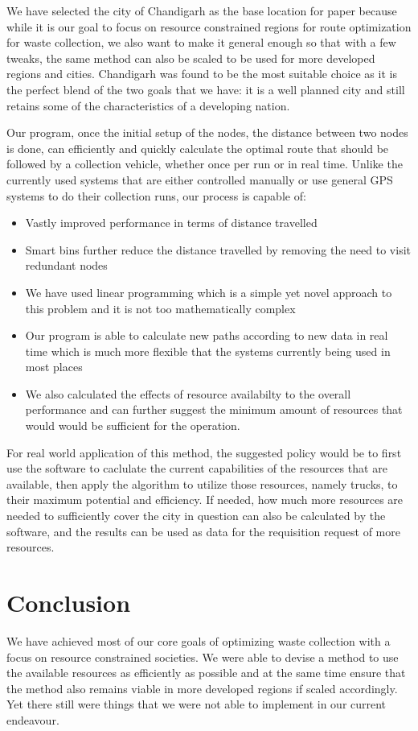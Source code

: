 \documentclass[12pt]{article}
\begin{document}
We have selected the city of Chandigarh as the base location for paper because while it is our goal to focus on resource constrained regions for route optimization for waste collection, we also want to make it general enough so that with a few tweaks, the same method can also be scaled to be used for more developed regions and cities. Chandigarh was found to be the most suitable choice as it is the perfect blend of the two goals that we have: it is a well planned city and still retains some of the characteristics of a developing nation.

Our program, once the initial setup of the nodes, the distance between two nodes is done, can efficiently and quickly calculate the optimal route that should be followed by a collection vehicle, whether once per run or in real time. Unlike the currently used systems that are either controlled manually or use general GPS systems to do their collection runs, our process is capable of:
\begin{itemize}
    \item Vastly improved performance in terms of distance travelled
    \item Smart bins further reduce the distance travelled by removing the need to visit redundant nodes
    \item We have used linear programming which is a simple yet novel approach to this problem and it is not too mathematically complex
    \item Our program is able to calculate new paths according to new data in real time which is much more flexible that the systems currently being used in most places
    \item We also calculated the effects of resource availabilty to the overall performance and can further suggest the minimum amount of resources that would would be sufficient for the operation.
\end{itemize}

For real world application of this method, the suggested policy would be to first use the software to caclulate the current capabilities of the resources that are available, then apply the algorithm to utilize those resources, namely trucks, to their maximum potential and efficiency. If needed, how much more resources are needed to sufficiently cover the city in question can also be calculated by the software, and the results can be used as data for the requisition request of more resources.

\section{Conclusion}
We have achieved most of our core goals of optimizing waste collection with a focus on resource constrained societies. We were able to devise a method to use the available resources as efficiently as possible and at the same time ensure that the method also remains viable in more developed regions if scaled accordingly. Yet there still were things that we were not able to implement in our current endeavour. 
\end{document}
